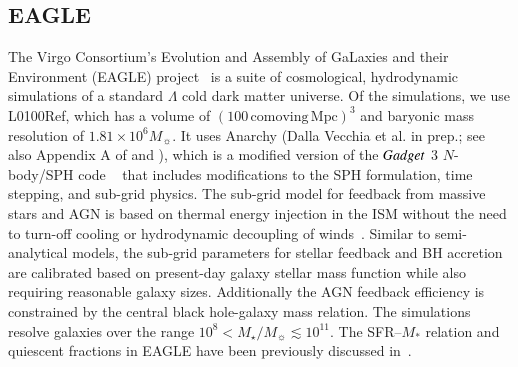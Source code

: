 \documentclass[tighten, preprint]{aastex62}
\begin{document}
\subsection{EAGLE}
The Virgo Consortium's Evolution and Assembly of GaLaxies and their 
Environment (EAGLE) project~\citep{schaye2015, crain2015} is a suite 
of cosmological, hydrodynamic simulations of a standard 
$\Lambda$ cold dark matter universe. Of the simulations, we use 
L0100Ref, which has a volume of $(100\,\mathrm{comoving\,Mpc})^3$ and 
baryonic mass resolution of $1.81\times 10^6M_{\sun}$. 
It uses {\sc Anarchy} (Dalla Vecchia et al. in prep.; 
see also Appendix A of \citealt{schaye2015} and \citealt{schaller2015}), 
which is a modified version of the ${\sc Gadget}$ 3 $N$-body/SPH 
code ~\citep{springel2005} that includes modifications to the SPH formulation, 
time stepping, and sub-grid physics. The sub-grid model for feedback from massive stars and AGN is 
based on thermal energy injection in the ISM without the need to turn-off
cooling or hydrodynamic decoupling of winds~\citep{dallavecchia2012}. 
Similar to semi-analytical models, the sub-grid parameters for stellar 
feedback and BH accretion are calibrated based on present-day galaxy 
stellar mass function while also requiring reasonable galaxy sizes.
Additionally the AGN feedback efficiency is constrained by the central 
black hole-galaxy mass relation. The simulations resolve galaxies over 
the range $10^{8} < M_{\star}/M_{\sun} \lesssim 10^{11}$. %
The SFR--$M_*$ relation and quiescent fractions in EAGLE have been 
previously discussed in~\citet{furlong2015, trayford2015, trayford2017}. 
\end{document}
